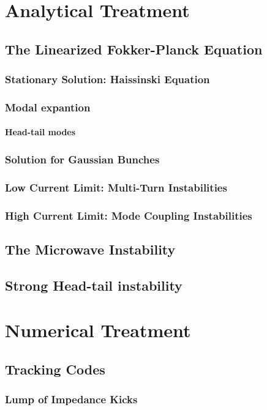 \documentclass[
	12pt,				%
	openright,			%
	oneside,			%
	a4paper,		%
	chapter=TITLE,		%
	section=TITLE,		%
    brazil,				%
	english,			%
	sumario=tradicional,
	]{abntex2}
\begin{document}
  \section{Analytical Treatment}
    \subsection{The Linearized Fokker-Planck Equation}
      \subsubsection{Stationary Solution: Haissinski Equation}
      \subsubsection{Modal expantion}
        \paragraph{Head-tail modes}
      \subsubsection{Solution for Gaussian Bunches}
      \subsubsection{Low Current Limit: Multi-Turn Instabilities}
      \subsubsection{High Current Limit: Mode Coupling Instabilities}
    \subsection{The Microwave Instability}
    \subsection{Strong Head-tail instability}
  \section{Numerical Treatment}
    \subsection{Tracking Codes}
      \subsubsection{Lump of Impedance Kicks}
\end{document}
